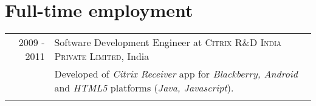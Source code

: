 \documentclass[a4paper,10pt]{article}
\begin{document}

\section {Full-time employment}
\begin{tabular}{r|l}

  \textsc{2009 - 2011} & Software Development Engineer at
                \textsc{Citrix R\&D India Private Limited}, India \\
                       &\footnotesize{Developed of  \emph{Citrix
                 Receiver} app for
                   \emph{Blackberry, Android}  and \emph{HTML5} platforms
                   (\emph{Java, Javascript}).
                   }\\\multicolumn{2}{c}{} \\  
\end{tabular}
\end{document}
